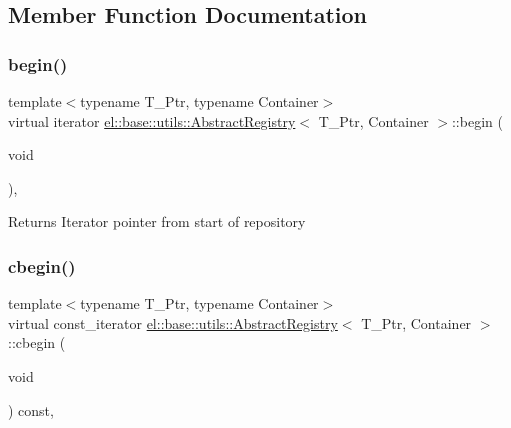 \subsection{Member Function Documentation}
\mbox{\label{classel_1_1base_1_1utils_1_1_abstract_registry_a4ad971b1dddff996d327452d852e55b2}} 
\subsubsection{\texorpdfstring{begin()}{begin()}}
{\footnotesize\ttfamily template$<$typename T\+\_\+\+Ptr, typename Container$>$ \\
virtual iterator \hyperlink{classel_1_1base_1_1utils_1_1_abstract_registry}{el\+::base\+::utils\+::\+Abstract\+Registry}$<$ T\+\_\+\+Ptr, Container $>$\+::begin (\begin{DoxyParamCaption}\item[{void}]{ }\end{DoxyParamCaption})\hspace{0.3cm}{\ttfamily [inline]}, {\ttfamily [virtual]}}

\begin{DoxyReturn}{Returns}
Iterator pointer from start of repository 
\end{DoxyReturn}
\mbox{\label{classel_1_1base_1_1utils_1_1_abstract_registry_a37f743184e808d7c0028e21e0d0898bb}} 
\subsubsection{\texorpdfstring{cbegin()}{cbegin()}}
{\footnotesize\ttfamily template$<$typename T\+\_\+\+Ptr, typename Container$>$ \\
virtual const\+\_\+iterator \hyperlink{classel_1_1base_1_1utils_1_1_abstract_registry}{el\+::base\+::utils\+::\+Abstract\+Registry}$<$ T\+\_\+\+Ptr, Container $>$\+::cbegin (\begin{DoxyParamCaption}\item[{void}]{ }\end{DoxyParamCaption}) const\hspace{0.3cm}{\ttfamily [inline]}, {\ttfamily [virtual]}}

